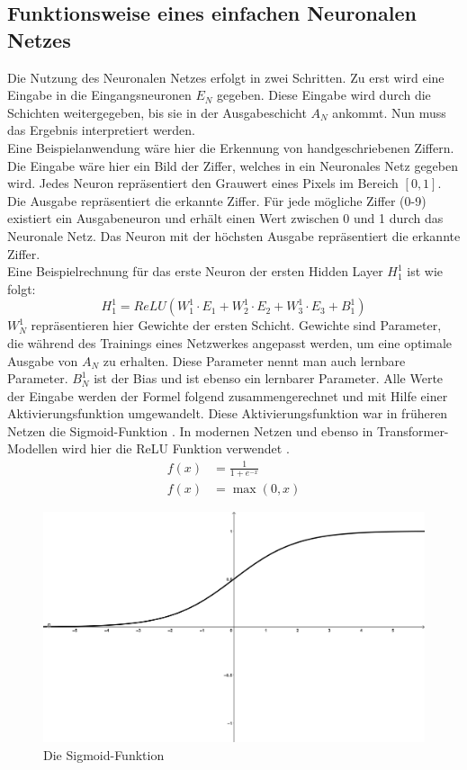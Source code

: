\subsection{Funktionsweise eines einfachen Neuronalen Netzes}
Die Nutzung des Neuronalen Netzes erfolgt in zwei Schritten.
Zu erst wird eine Eingabe in die Eingangsneuronen $E_N$ gegeben.
Diese Eingabe wird durch die Schichten weitergegeben, bis sie in der Ausgabeschicht $A_N$ ankommt.
Nun muss das Ergebnis interpretiert werden.\\

Eine Beispielanwendung wäre hier die Erkennung von handgeschriebenen Ziffern.
Die Eingabe wäre hier ein Bild der Ziffer, welches in ein Neuronales Netz gegeben wird.
Jedes Neuron repräsentiert den Grauwert eines Pixels im Bereich $[0,1]$.
Die Ausgabe repräsentiert die erkannte Ziffer.
Für jede mögliche Ziffer (0-9) existiert ein Ausgabeneuron und erhält einen Wert zwischen 0 und 1 durch das Neuronale Netz.
Das Neuron mit der höchsten Ausgabe repräsentiert die erkannte Ziffer.\\

Eine Beispielrechnung für das erste Neuron der ersten Hidden Layer $H^1_1$ ist wie folgt:
\begin{equation}
    H^1_1=ReLU(W^1_1\cdot E_1 + W^1_2\cdot E_2 + W^1_3\cdot E_3 + B^1_1)
\end{equation}
$W^1_N$ repräsentieren hier Gewichte der ersten Schicht.
Gewichte sind Parameter, die während des Trainings eines Netzwerkes angepasst werden, um eine optimale Ausgabe von $A_N$ zu erhalten.
Diese Parameter nennt man auch lernbare Parameter.
$B^1_N$ ist der Bias und ist ebenso ein lernbarer Parameter.
Alle Werte der Eingabe werden der Formel folgend zusammengerechnet und mit Hilfe einer Aktivierungsfunktion umgewandelt.
Diese Aktivierungsfunktion war in früheren Netzen die Sigmoid-Funktion .
In modernen Netzen und ebenso in Transformer-Modellen wird hier die ReLU Funktion verwendet .
\begin{align}
    f(x) &= \frac{1}{1+e^{-x}}\label{eq:sigmoid}\\
    f(x) &= \max(0,x) \label{eq:relu}
\end{align}

\begin{figure}
    \centering
    \includegraphics[width=\textwidth]{zeichnungen/sigmoid.png}
    \caption{Die Sigmoid-Funktion}\label{img:sigmoid}
\end{figure}

